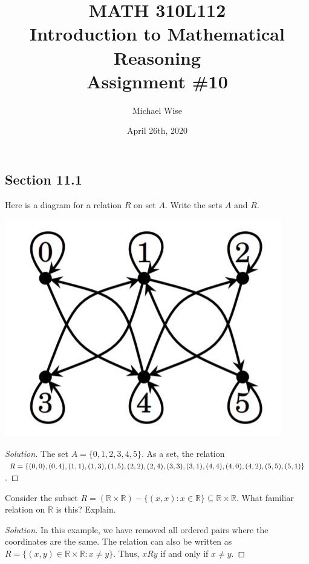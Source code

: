 \documentclass[12pt]{article}
\title{MATH 310L112\\
       Introduction to Mathematical Reasoning\\
       Assignment \#10}
\author{Michael Wise}
\date{April 26th, 2020}
\begin{document}
\maketitle
\begin{description}
\section*{Section 11.1}
\item[Exercise 4:] Here is a diagram for a relation $R$ on set $A$. Write the sets $A$ and $R$.
\begin{center}
\includegraphics[scale = .4]{images/11.1ex4.JPG}
\end{center}
\begin{spacing}{2}
\begin{proof}[Solution]
The set $A = \{0,1,2,3,4,5\}$. As a set, the relation $R = \{(0,0), (0,4), (1,1), 
\newline
(1,3), (1,5), (2,2), (2,4), (3,3), (3,1), (4,4), (4,0), (4,2), (5,5), (5,1)\}$.
\end{proof}
\end{spacing}
\item[Exercise 10:] Consider the subset $R = (\mathbb{R} \times \mathbb{R}) - \{(x,x):x \in \mathbb{R}\} \subseteq \mathbb{R} \times \mathbb{R}.$ What familiar relation on $\mathbb{R}$ is this? Explain.
\begin{spacing}{2}
\begin{proof}[Solution]
In this example, we have removed all ordered pairs where the coordinates are the same. The relation can also be written as $R = \{(x,y) \in \mathbb{R} \times \mathbb{R}: x \neq y\}$. Thus, $x R y$ if and only if $x \neq y$.
\end{proof}
\end{spacing} 

\end{description}
\end{document}

